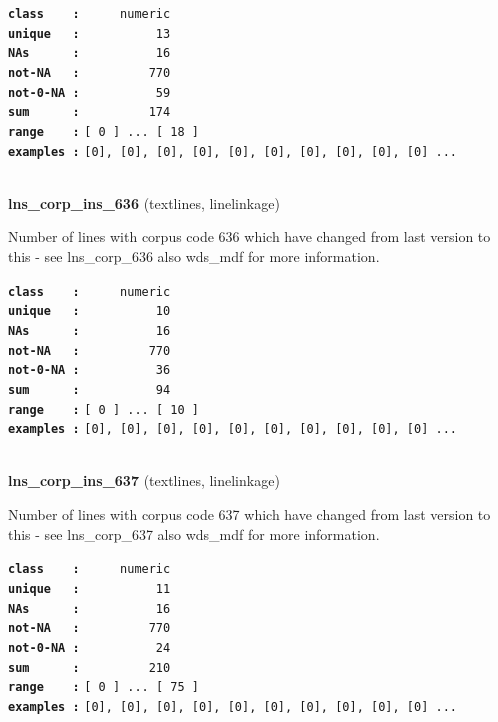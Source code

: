 \documentclass[]{article}
\begin{document}
\textbf{\texttt{class\ \ \ \ :}} \texttt{~~~~~numeric}\\
\textbf{\texttt{unique\ \ \ :}} \texttt{~~~~~~~~~~13}\\
\textbf{\texttt{NAs\ \ \ \ \ \ :}} \texttt{~~~~~~~~~~16}\\
\textbf{\texttt{not-NA\ \ \ :}} \texttt{~~~~~~~~~770}\\
\textbf{\texttt{not-0-NA\ :}} \texttt{~~~~~~~~~~59}\\
\textbf{\texttt{sum\ \ \ \ \ \ :}} \texttt{~~~~~~~~~174}\\
\textbf{\texttt{range\ \ \ \ :}}
\texttt{{[}\ 0\ {]}\ ...\ {[}\ 18\ {]}}\\
\textbf{\texttt{examples\ :}}
\texttt{{[}0{]},\ {[}0{]},\ {[}0{]},\ {[}0{]},\ {[}0{]},\ {[}0{]},\ {[}0{]},\ {[}0{]},\ {[}0{]},\ {[}0{]}\ ...}\\

~

\textbf{lns\_corp\_ins\_636} (textlines, linelinkage)

Number of lines with corpus code 636 which have changed from last
version to this - see lns\_corp\_636 also wds\_mdf for more information.

\textbf{\texttt{class\ \ \ \ :}} \texttt{~~~~~numeric}\\
\textbf{\texttt{unique\ \ \ :}} \texttt{~~~~~~~~~~10}\\
\textbf{\texttt{NAs\ \ \ \ \ \ :}} \texttt{~~~~~~~~~~16}\\
\textbf{\texttt{not-NA\ \ \ :}} \texttt{~~~~~~~~~770}\\
\textbf{\texttt{not-0-NA\ :}} \texttt{~~~~~~~~~~36}\\
\textbf{\texttt{sum\ \ \ \ \ \ :}} \texttt{~~~~~~~~~~94}\\
\textbf{\texttt{range\ \ \ \ :}}
\texttt{{[}\ 0\ {]}\ ...\ {[}\ 10\ {]}}\\
\textbf{\texttt{examples\ :}}
\texttt{{[}0{]},\ {[}0{]},\ {[}0{]},\ {[}0{]},\ {[}0{]},\ {[}0{]},\ {[}0{]},\ {[}0{]},\ {[}0{]},\ {[}0{]}\ ...}\\

~

\textbf{lns\_corp\_ins\_637} (textlines, linelinkage)

Number of lines with corpus code 637 which have changed from last
version to this - see lns\_corp\_637 also wds\_mdf for more information.

\textbf{\texttt{class\ \ \ \ :}} \texttt{~~~~~numeric}\\
\textbf{\texttt{unique\ \ \ :}} \texttt{~~~~~~~~~~11}\\
\textbf{\texttt{NAs\ \ \ \ \ \ :}} \texttt{~~~~~~~~~~16}\\
\textbf{\texttt{not-NA\ \ \ :}} \texttt{~~~~~~~~~770}\\
\textbf{\texttt{not-0-NA\ :}} \texttt{~~~~~~~~~~24}\\
\textbf{\texttt{sum\ \ \ \ \ \ :}} \texttt{~~~~~~~~~210}\\
\textbf{\texttt{range\ \ \ \ :}}
\texttt{{[}\ 0\ {]}\ ...\ {[}\ 75\ {]}}\\
\textbf{\texttt{examples\ :}}
\texttt{{[}0{]},\ {[}0{]},\ {[}0{]},\ {[}0{]},\ {[}0{]},\ {[}0{]},\ {[}0{]},\ {[}0{]},\ {[}0{]},\ {[}0{]}\ ...}\\
\end{document}
